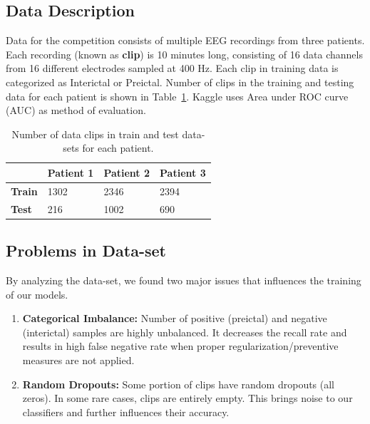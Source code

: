 \documentclass[letterpaper,12pt]{article}
\begin{document}
\subsection{Data Description}

Data for the competition consists of multiple EEG recordings from three
patients. Each recording (known as \textbf{clip}) is 10 minutes long, consisting
of 16 data channels from 16 different electrodes sampled at 400 Hz. Each clip in
training data is categorized as Interictal or Preictal. Number of clips in the
training and testing data for each patient is shown in
Table~\ref{tab:data-summary}. Kaggle uses Area under ROC curve (AUC) as
method of evaluation.

\begin{table}[h]
  \centering
  \begin{tabular}{@{}|l|l|l|l|@{}}
    \toprule
    & \textbf{Patient 1} & \textbf{Patient 2} & \textbf{Patient 3} \\ \midrule
    \textbf{Train} & 1302      & 2346      & 2394      \\ \midrule
    \textbf{Test}  & 216       & 1002      & 690       \\ \bottomrule
  \end{tabular}
  \caption{Number of data clips in train and test data-sets for each patient.\label{tab:data-summary}}
\end{table}

\subsection{Problems in Data-set}
By analyzing the data-set, we found two major issues that influences
the training of our models.

\begin{enumerate}
\item \textbf{Categorical Imbalance:} Number of positive (preictal) and
  negative (interictal) samples are highly unbalanced. It
  decreases the recall rate and results in high false negative rate when
  proper regularization/preventive measures are not applied.

\item \textbf{Random Dropouts:} Some portion of clips have random dropouts (all
  zeros). In some rare cases, clips are entirely empty. This brings
  noise to our classifiers and further influences their accuracy.
  
\end{enumerate}
\end{document}
